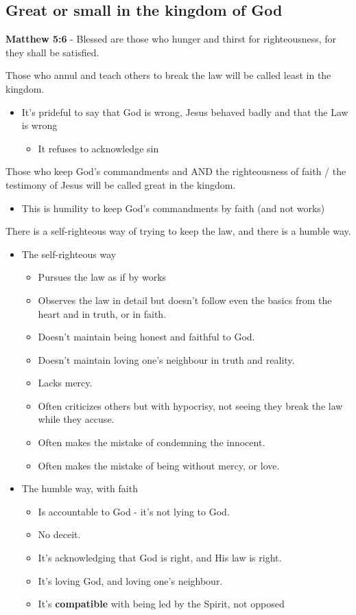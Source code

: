 \documentclass[11pt]{article}
\begin{document}
\subsection{Great or small in the kingdom of God}
\label{sec:org4eaadd4}
\textbf{Matthew 5:6} - Blessed are those who hunger and thirst for righteousness, for they shall be satisfied.

Those who annul and teach others to break the law will be called least in the kingdom.
\begin{itemize}
\item It's prideful to say that God is wrong, Jesus behaved badly and that the Law is wrong
\begin{itemize}
\item It refuses to acknowledge sin
\end{itemize}
\end{itemize}
Those who keep God's commandments and AND the righteousness of faith / the testimony of Jesus will be called great in the kingdom.
\begin{itemize}
\item This is humility to keep God's commandments by faith (and not works)
\end{itemize}

There is a self-righteous way of trying to keep the law, and there is a humble way.
\begin{itemize}
\item The self-righteous way
\begin{itemize}
\item Pursues the law as if by works
\item Observes the law in detail but doesn't follow even the basics from the heart and in truth, or in faith.
\item Doesn't maintain being honest and faithful to God.
\item Doesn't maintain loving one's neighbour in truth and reality.
\item Lacks mercy.
\item Often criticizes others but with hypocrisy, not seeing they break the law while they accuse.
\item Often makes the mistake of condemning the innocent.
\item Often makes the mistake of being without mercy, or love.
\end{itemize}
\item The humble way, with faith
\begin{itemize}
\item Is accountable to God - it's not lying to God.
\item No deceit.
\item It's acknowledging that God is right, and His law is right.
\item It's loving God, and loving one's neighbour.
\item It's \textbf{compatible} with being led by the Spirit, not opposed
\end{itemize}
\end{itemize}
\end{document}
